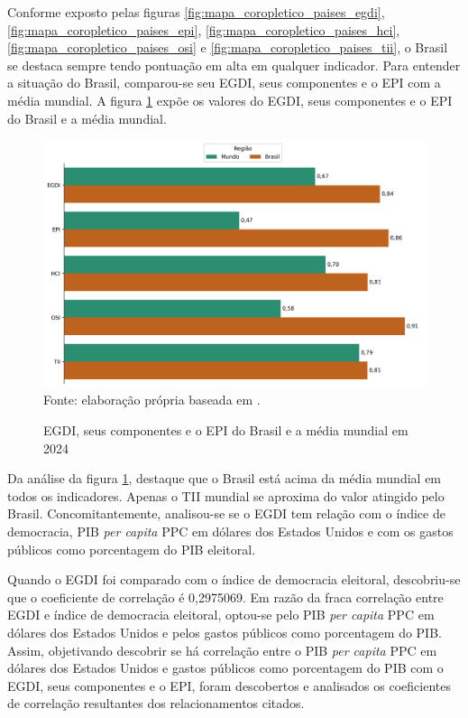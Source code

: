 Conforme exposto pelas figuras \ref{fig:mapa_coropletico_paises_egdi}, \ref{fig:mapa_coropletico_paises_epi}, \ref{fig:mapa_coropletico_paises_hci}, \ref{fig:mapa_coropletico_paises_osi} e \ref{fig:mapa_coropletico_paises_tii}, o Brasil se destaca sempre tendo pontuação em alta em qualquer indicador. Para entender a situação do Brasil, comparou-se seu EGDI, seus componentes e o EPI com a média mundial. A figura \ref{fig:comparacao_egdi_brasil_mundo} expõe os valores do EGDI, seus componentes e o EPI do Brasil e a média mundial.

\begin{figure}[H]
	\centering
	\caption{EGDI, seus componentes e o EPI do Brasil e a média mundial em 2024}
	\includegraphics[width=1\linewidth]{figuras/comparacao_egdi_brasil_mundo}
	\label{fig:comparacao_egdi_brasil_mundo}
	\footnotesize{Fonte: elaboração própria baseada em \cite{ONU_EGDI_dados}.}
\end{figure}

Da análise da figura \ref{fig:comparacao_egdi_brasil_mundo}, destaque que o Brasil está acima da média mundial em todos os indicadores. Apenas o TII mundial se aproxima do valor atingido pelo Brasil. Concomitantemente, analisou-se se o EGDI tem relação com o índice de democracia, PIB \textit{per capita} PPC em dólares dos Estados Unidos e com os gastos públicos como porcentagem do PIB eleitoral.

Quando o EGDI foi comparado com o índice de democracia eleitoral, descobriu-se que o coeficiente de correlação é 0,2975069. Em razão da fraca correlação entre EGDI e índice de democracia eleitoral, optou-se pelo PIB \textit{per capita} PPC em dólares dos Estados Unidos e pelos gastos públicos como porcentagem do PIB. Assim, objetivando descobrir se há correlação entre o PIB \textit{per capita} PPC em dólares dos Estados Unidos e gastos públicos como porcentagem do PIB com o EGDI, seus componentes e o EPI, foram descobertos e analisados os coeficientes de correlação resultantes dos relacionamentos citados.


